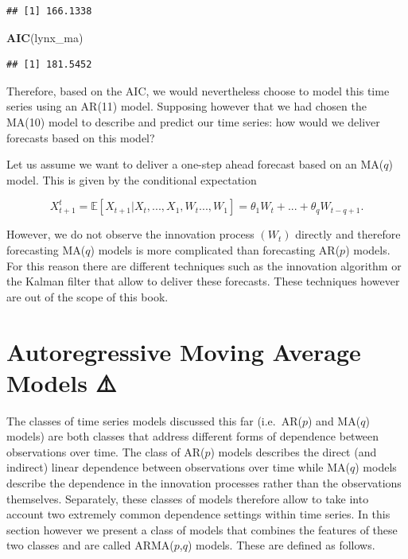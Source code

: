 \documentclass[]{book}
\newenvironment{Shaded}{\begin{snugshade}}{\end{snugshade}}
\newcommand{\KeywordTok}[1]{\textcolor[rgb]{0.13,0.29,0.53}{\textbf{#1}}}
\newcommand{\NormalTok}[1]{#1}
\theoremstyle{definition}
\theoremstyle{definition}
\theoremstyle{definition}
\theoremstyle{remark}
\let\BeginKnitrBlock\begin \let\EndKnitrBlock\end
\begin{document}
\begin{verbatim}
## [1] 166.1338
\end{verbatim}

\begin{Shaded}
\begin{Highlighting}[]
\KeywordTok{AIC}\NormalTok{(lynx_ma)}
\end{Highlighting}
\end{Shaded}

\begin{verbatim}
## [1] 181.5452
\end{verbatim}

Therefore, based on the AIC, we would nevertheless choose to model this
time series using an AR(11) model. Supposing however that we had chosen
the MA(10) model to describe and predict our time series: how would we
deliver forecasts based on this model?

\BeginKnitrBlock{example}[Forecasting MA models]
\protect\hypertarget{exm:forecastMA}{}{\label{exm:forecastMA}
{} }Let us assume we want to deliver
a one-step ahead forecast based on an MA(\(q\)) model. This is given by
the conditional expectation

\[X_{t+1}^t = \mathbb{E}\left[X_{t+1} | X_t, ..., X_1, W_t ..., W_1\right] = \theta_1 W_t + ... + \theta_q W_{t-q+1}.\]

However, we do not observe the innovation process \((W_t)\) directly and
therefore forecasting MA(\(q\)) models is more complicated than
forecasting AR(\(p\)) models. For this reason there are different
techniques such as the innovation algorithm or the Kalman filter that
allow to deliver these forecasts. These techniques however are out of
the scope of this book.
\EndKnitrBlock{example}

\section{Autoregressive Moving Average Models
⚠️}\label{autoregressive-moving-average-models}

The classes of time series models discussed this far (i.e.~AR(\(p\)) and
MA(\(q\)) models) are both classes that address different forms of
dependence between observations over time. The class of AR(\(p\)) models
describes the direct (and indirect) linear dependence between
observations over time while MA(\(q\)) models describe the dependence in
the innovation processes rather than the observations themselves.
Separately, these classes of models therefore allow to take into account
two extremely common dependence settings within time series. In this
section however we present a class of models that combines the features
of these two classes and are called ARMA(\(p\),\(q\)) models. These are
defined as follows.
\end{document}
